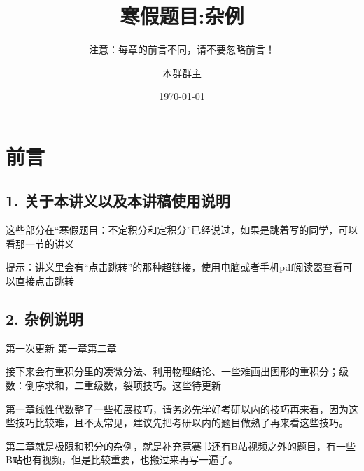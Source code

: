 \documentclass[lang=cn,newtx,10pt,scheme=chinese]{elegantbook}
\title{寒假题目:杂例} %
\subtitle{注意：每章的前言不同，请不要忽略前言！ }
\author{本群群主}
\institute{本群}
\date{\today}
\begin{document}
\maketitle
\frontmatter

\newpage

\section*{前言}

\subsection*{\textbf{1. 关于本讲义以及本讲稿使用说明}}
这些部分在“寒假题目：不定积分和定积分”已经说过，如果是跳着写的同学，可以看那一节的讲义

提示：讲义里会有“\href{https://www.bilibili.com/video/BV1GJ411x7h7/?share_source=copy_web&vd_source=270527b9d8a800872b201575fba2747c}{点击跳转}”的那种超链接，使用电脑或者手机pdf阅读器查看可以直接点击跳转

\subsection*{\textbf{2. 杂例说明}}
第一次更新 第一章第二章

接下来会有重积分里的凑微分法、利用物理结论、一些难画出图形的重积分；级数：倒序求和，二重级数，裂项技巧。这些待更新

第一章线性代数整了一些拓展技巧，请务必先学好考研以内的技巧再来看，因为这些技巧比较难，且不太常见，建议先把考研以内的题目做熟了再来看这些技巧。

第二章就是极限和积分的杂例，就是补充竞赛书还有B站视频之外的题目，有一些B站也有视频，但是比较重要，也搬过来再写一遍了。
\newpage

\tableofcontents
\mainmatter

\newpage

\end{document}
